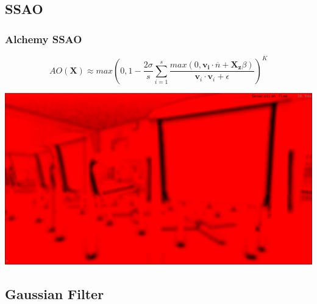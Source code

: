\documentclass{beamer}
\begin{document}




\subsection{SSAO}

\begin{frame}
\frametitle{Alchemy SSAO}
$$AO(\mathbf{X}) \approx max \left( 0 , 1 - \frac{2 \sigma}{s} \sum_{i = 1}^{s} \frac{max(0,\mathbf{v_i} \cdot \overline{n} + \mathbf{X_z} \beta)}{\mathbf{v}_i \cdot \mathbf{v}_i + \epsilon} \right) ^K$$
\begin{center}
\includegraphics[scale=0.25]{img/ssao}
\end{center}
\end{frame}


\subsection{Gaussian Filter}
\end{document}
